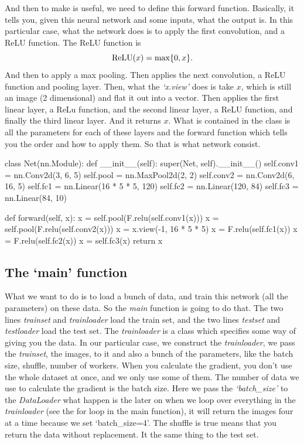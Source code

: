 And then to make is useful, we need to define this forward function. Basically, it tells you, given this neural network and some inputs, what the output is. In this particular case, what the network does is to apply the first convolution, and a ReLU function. The ReLU function is
$${\rm ReLU}(x) = \max\{0,x\}.$$
And then to apply a max pooling. Then applies the next convolution, a ReLU function and pooling layer.
Then, what the \emph{`x.view'} does is take $x$, which is still an image (2 dimensional) and flat it out into a vector. Then applies the first linear layer, a ReLu function, and the second linear layer, a ReLU function, and finally the third linear layer. And it returns $x$. What is contained in the class is all the parameters for each of these layers and the forward function which tells you the order and how to apply them. So that is what network consist.
\begin{python}
class Net(nn.Module):
    def __init__(self):
        super(Net, self).__init__()
        self.conv1 = nn.Conv2d(3, 6, 5)
        self.pool = nn.MaxPool2d(2, 2)
        self.conv2 = nn.Conv2d(6, 16, 5)
        self.fc1 = nn.Linear(16 * 5 * 5, 120)
        self.fc2 = nn.Linear(120, 84)
        self.fc3 = nn.Linear(84, 10)

    def forward(self, x):
        x = self.pool(F.relu(self.conv1(x)))
        x = self.pool(F.relu(self.conv2(x)))
        x = x.view(-1, 16 * 5 * 5)
        x = F.relu(self.fc1(x))
        x = F.relu(self.fc2(x))
        x = self.fc3(x)
        return x
\end{python}

\subsection{The `main' function}
What we want to do is to load a bunch of data, and train this network (all the parameters) on these data. So the \emph{main} function is going to do that. The two lines \emph{trainset} and \emph{trainloader} load the train set, and the two lines \emph{testset} and \emph{testloader} load the test set. The \emph{trainloader} is a class which specifies some way of giving you the data. In our particular case, we construct the \emph{trainloader}, we pass the \emph{trainset}, the images, to it and also a bunch of the parameters, like the batch size, shuffle, number of workers. When you calculate the gradient, you don't use the whole dataset at once, and we only use some of them. The number of data we use to calculate the gradient is the batch size. Here we pass the \emph{`batch\_size'} to the \emph{DataLoader} what happen is the later on when we loop over everything in the \emph{trainloader} (see the for loop in the main function), it will return the images four at a time because we set `batch\_size=4'. The shuffle is true means that you return the data without replacement. It the same thing to the test set.

